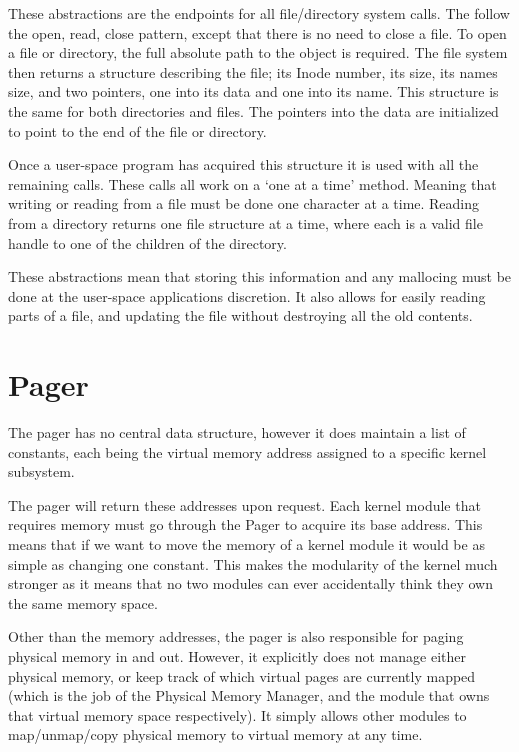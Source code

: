\documentclass[a4paper]{report}
\begin{document}
These abstractions are the endpoints for all file/directory system calls. The follow the open, read, close pattern, except that there is no need to close a file. To open a file or directory, the full absolute path to the object is required. The file system then returns a structure describing the file; its Inode number, its size, its names size, and two pointers, one into its data and one into its name. This structure is the same for both directories and files. The pointers into the data are initialized to point to the end of the file or directory.

Once a user-space program has acquired this structure it is used with all the remaining calls. These calls all work on a `one at a time' method. Meaning that writing or reading from a file must be done one character at a time. Reading from a directory returns one file structure at a time, where each is a valid file handle to one of the children of the directory.

These abstractions mean that storing this information and any mallocing must be done at the user-space applications discretion. It also allows for easily reading parts of a file, and updating the file without destroying all the old contents.




















\section{Pager}

The pager has no central data structure, however it does maintain a list of constants, each being the virtual memory address assigned to a specific kernel subsystem.

The pager will return these addresses upon request. Each kernel module that requires memory must go through the Pager to acquire its base address. This means that if we want to move the memory of a kernel module it would be as simple as changing one constant. This makes the modularity of the kernel much stronger as it means that no two modules can ever accidentally think they own the same memory space.

Other than the memory addresses, the pager is also responsible for paging physical memory in and out. However, it explicitly does not manage either physical memory, or keep track of which virtual pages are currently mapped (which is the job of the Physical Memory Manager, and the module that owns that virtual memory space respectively). It simply allows other modules to map/unmap/copy physical memory to virtual memory at any time.
\end{document}
